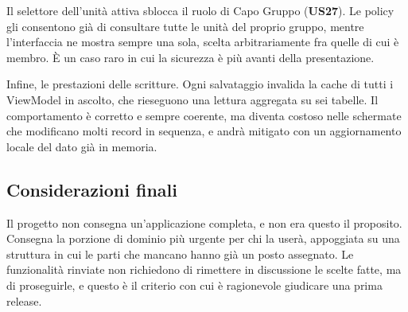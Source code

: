 \documentclass[11pt]{article}
\numberwithin{figure}{section}
\begin{document}
Il selettore dell'unità attiva sblocca il ruolo di Capo Gruppo (\textbf{US27}). Le policy gli consentono già di consultare tutte le unità del proprio gruppo, mentre l'interfaccia ne mostra sempre una sola, scelta arbitrariamente fra quelle di cui è membro. È un caso raro in cui la sicurezza è più avanti della presentazione.

Infine, le prestazioni delle scritture. Ogni salvataggio invalida la cache di tutti i ViewModel in ascolto, che rieseguono una lettura aggregata su sei tabelle. Il comportamento è corretto e sempre coerente, ma diventa costoso nelle schermate che modificano molti record in sequenza, e andrà mitigato con un aggiornamento locale del dato già in memoria.

\subsection{Considerazioni finali}

Il progetto non consegna un'applicazione completa, e non era questo il proposito. Consegna la porzione di dominio più urgente per chi la userà, appoggiata su una struttura in cui le parti che mancano hanno già un posto assegnato. Le funzionalità rinviate non richiedono di rimettere in discussione le scelte fatte, ma di proseguirle, e questo è il criterio con cui è ragionevole giudicare una prima release.
\end{document}

